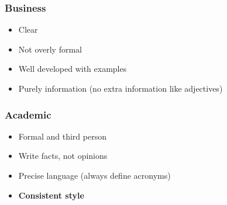 \subsubsection{Business}\label{ssub:business}

\begin{itemize}
    \item Clear
    \item Not overly formal
    \item Well developed with examples
    \item Purely information (no extra information like adjectives)
\end{itemize}

\subsubsection{Academic}\label{ssub:academic}

\begin{itemize}
    \item Formal and third person
    \item Write facts, not opinions
    \item Precise language (always define acronyms)
    \item \textbf{Consistent style}
\end{itemize}
